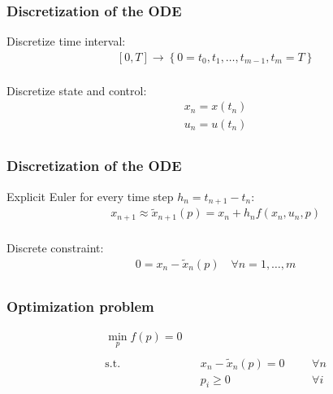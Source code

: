 \documentclass{beamer}
\begin{document}
\begin{frame}
	\frametitle{Discretization of the ODE}
	
	
	Discretize time interval:
	\begin{align*}
	  &[0,T] \rightarrow \left\{ 0=t_0, t_1, \dots, t_{m-1}, t_{m}=T 
\right\} \\
	\end{align*}
	
	Discretize state and control:
	\begin{align*}
	  &x_n = x(t_n) \\
	  &u_n = u(t_n) \\
	\end{align*}
	
\end{frame}

\begin{frame}
	
	\frametitle{Discretization of the ODE}
	
	Explicit Euler for every time step $h_n=t_{n+1}-t_n$:
	\begin{align*}
        &x_{n+1} \approx \tilde{x}_{n+1}(p) = x_n + h_n f(x_n,u_n,p) \\
	\end{align*}
	
	Discrete constraint:
	\begin{align*}
        &0 = x_{n} - \tilde{x}_{n}(p) \quad \forall n = 1,\ldots,m\\
	\end{align*}

	
\end{frame}

\begin{frame}
    \frametitle{Optimization problem}

    \begin{align*}
        &\min\limits_p f(p) = 0
        & &\\
        &\\
        &\text{s.t.}
        & &x_{n} - \tilde{x}_{n}(p) = 0
        & & &\forall n \\
        &
        & &p_i \geq 0
        & & &\forall i \\
    \end{align*}
\end{frame}
\end{document}
